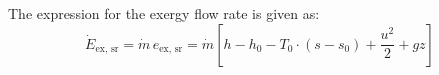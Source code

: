 The expression for the exergy flow rate is given as:  
\[
\dot{E}_{\text{ex, sr}} = \dot{m} \, e_{\text{ex, sr}} = \dot{m} \left[ h - h_0 - T_0 \cdot (s - s_0) + \frac{u^2}{2} + gz \right]
\]